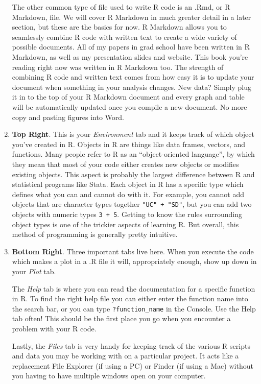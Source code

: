 \documentclass[
  letterpaper,
]{book}
\theoremstyle{definition}
\theoremstyle{definition}
\theoremstyle{plain}
\theoremstyle{definition}
\theoremstyle{plain}
\theoremstyle{plain}
\theoremstyle{remark}
\begin{document}
\begin{enumerate}
  The other common type of file used to write R code is an .Rmd, or R
  Markdown, file. We will cover R Markdown in much greater detail in a
  later section, but these are the basics for now. R Markdown allows you
  to seamlessly combine R code with written text to create a wide
  variety of possible documents. All of my papers in grad school have
  been written in R Markdown, as well as my presentation slides and
  website. This book you're reading right now was written in R Markdown
  too. The strength of combining R code and written text comes from how
  easy it is to update your document when something in your analysis
  changes. New data? Simply plug it in to the top of your R Markdown
  document and every graph and table will be automatically updated once
  you compile a new document. No more copy and pasting figures into
  Word.
\item
  \textbf{Top Right}. This is your \emph{Environment} tab and it keeps
  track of which object you've created in R. Objects in R are things
  like data frames, vectors, and functions. Many people refer to R as an
  ``object-oriented language'', by which they mean that most of your
  code either creates new objects or modifies existing objects. This
  aspect is probably the largest difference between R and statistical
  programs like Stata. Each object in R has a specific type which
  defines what you can and cannot do with it. For example, you cannot
  add objects that are character types together \texttt{"UC"\ +\ "SD"},
  but you can add two objects with numeric types \texttt{3\ +\ 5}.
  Getting to know the rules surrounding object types is one of the
  trickier aspects of learning R. But overall, this method of
  programming is generally pretty intuitive.
\item
  \textbf{Bottom Right}. Three important tabs live here. When you
  execute the code which makes a plot in a .R file it will,
  appropriately enough, show up down in your \emph{Plot} tab.

  The \emph{Help} tab is where you can read the documentation for a
  specific function in R. To find the right help file you can either
  enter the function name into the search bar, or you can type
  \texttt{?function\_name} in the Console. Use the Help tab often! This
  should be the first place you go when you encounter a problem with
  your R code.

  Lastly, the \emph{Files} tab is very handy for keeping track of the
  various R scripts and data you may be working with on a particular
  project. It acts like a replacement File Explorer (if using a PC) or
  Finder (if using a Mac) without you having to have multiple windows
  open on your computer.
\end{enumerate}
\end{document}
